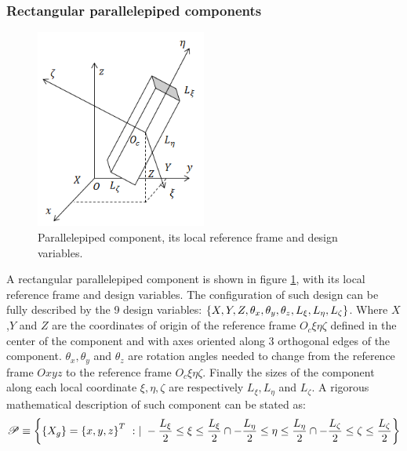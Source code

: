  \subsubsection{Rectangular parallelepiped components}
   \begin{figure}[!ht]
   \centering
    \includegraphics[width=0.5\textwidth]{images/Ch3/parallelepiped_component}
  \caption{Parallelepiped component, its local reference frame and design variables.}
  \label{fig:3.30}       %
  \end{figure}
A rectangular parallelepiped component is shown in figure \ref{fig:3.30}, with its local reference frame and design variables.
The configuration of such design can be fully described by the 9 design variables: $\left\lbrace{X,Y,Z,\theta_x ,\theta_y ,\theta_z ,L_\xi ,L_\eta ,L_\zeta}\right \rbrace$. Where $X$,$Y$ and $Z$ are the coordinates of origin of the reference frame $O_c\xi \eta \zeta$ defined in the center of the component and with axes oriented along 3 orthogonal edges of the component. $\theta_x ,\theta_y$ and $\theta_z$ are rotation angles needed to change from the reference frame   $Oxyz$ to the reference frame $O_c\xi \eta \zeta$. Finally the sizes of the component along each local coordinate $\xi ,\eta ,\zeta$ are respectively $L_\xi ,L_\eta$ and $L_\zeta$.
  A rigorous mathematical description of such component can be stated as:
  \begin{equation}
  \label{eq.3.117}
  \mathscr{P}\equiv\VectorVar{\VectorVar{X_g}=\VectorVar{x,y,z}^T\ :| \ -\frac{L_\xi}{2}\leq\xi\leq\frac{L_\xi}{2}\cap-\frac{L_\eta}{2}\leq\eta\leq\frac{L_\eta}{2}\cap-\frac{L_\zeta}{2}\leq\zeta\leq\frac{L_\zeta}{2}}
  \end{equation}
